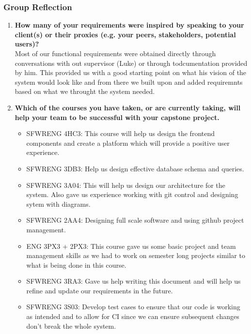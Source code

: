 
\subsubsection*{Group Reflection}
\begin{enumerate}
  \item \textbf{How many of your requirements were inspired by speaking to your client(s) or their proxies (e.g. your peers, stakeholders, potential users)?}\\
  Most of our functional requirements were obtained directly through conversations with out supervisor (Luke) or through todcumentation provided by him. This provided us with a good starting point on what his vision of the system would look like and from there we built upon and added requiremnts based on what we throught the system needed.

  \item \textbf{Which of the courses you have taken, or are currently taking, will help your team to be successful with your capstone project.}
  \begin{itemize}
      \item SFWRENG 4HC3: This course will help us design the frontend components and create a platform which will provide a positive user experience.
      \item SFWRENG 3DB3: Help us design effective database schema and queries.
      \item SFWRENG 3A04: This will help us design our architecture for the system. Also gave us experience working with git control and designing sytem with diagrams.
      \item SFWRENG 2AA4: Designing full scale software and using github project management.
      \item ENG 3PX3 + 2PX3: This course gave us some basic project and team management skills as we had to work on semester long projects similar to what is being done in this course.
      \item SFWRENG 3RA3: Gave us help writing this document and will help us refine and update our requirements in the future.
      \item SFWRENG 3S03: Develop test cases to ensure that our code is working as intended and to allow for CI since we can ensure subsequent changes don't break the whole system.
  \end{itemize}


\end{enumerate}
